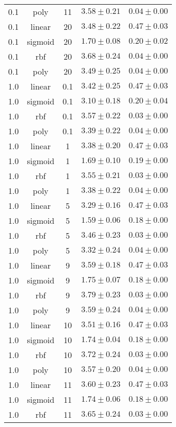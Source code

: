 \begin{tabular}{cccrr}
0.1 & poly & 11 & $3.58 \pm 0.21$ & $0.04 \pm 0.00$\\
0.1 & linear & 20 & $3.48 \pm 0.22$ & $0.47 \pm 0.03$\\
0.1 & sigmoid & 20 & $1.70 \pm 0.08$ & $0.20 \pm 0.02$\\
0.1 & rbf & 20 & $3.68 \pm 0.24$ & $0.04 \pm 0.00$\\
0.1 & poly & 20 & $3.49 \pm 0.25$ & $0.04 \pm 0.00$\\
1.0 & linear & 0.1 & $3.42 \pm 0.25$ & $0.47 \pm 0.03$\\
1.0 & sigmoid & 0.1 & $3.10 \pm 0.18$ & $0.20 \pm 0.04$\\
1.0 & rbf & 0.1 & $3.57 \pm 0.22$ & $0.03 \pm 0.00$\\
1.0 & poly & 0.1 & $3.39 \pm 0.22$ & $0.04 \pm 0.00$\\
1.0 & linear & 1 & $3.38 \pm 0.20$ & $0.47 \pm 0.03$\\
1.0 & sigmoid & 1 & $1.69 \pm 0.10$ & $0.19 \pm 0.00$\\
1.0 & rbf & 1 & $3.55 \pm 0.21$ & $0.03 \pm 0.00$\\
1.0 & poly & 1 & $3.38 \pm 0.22$ & $0.04 \pm 0.00$\\
1.0 & linear & 5 & $3.29 \pm 0.16$ & $0.47 \pm 0.03$\\
1.0 & sigmoid & 5 & $1.59 \pm 0.06$ & $0.18 \pm 0.00$\\
1.0 & rbf & 5 & $3.46 \pm 0.23$ & $0.03 \pm 0.00$\\
1.0 & poly & 5 & $3.32 \pm 0.24$ & $0.04 \pm 0.00$\\
1.0 & linear & 9 & $3.59 \pm 0.18$ & $0.47 \pm 0.03$\\
1.0 & sigmoid & 9 & $1.75 \pm 0.07$ & $0.18 \pm 0.00$\\
1.0 & rbf & 9 & $3.79 \pm 0.23$ & $0.03 \pm 0.00$\\
1.0 & poly & 9 & $3.59 \pm 0.24$ & $0.04 \pm 0.00$\\
1.0 & linear & 10 & $3.51 \pm 0.16$ & $0.47 \pm 0.03$\\
1.0 & sigmoid & 10 & $1.74 \pm 0.04$ & $0.18 \pm 0.00$\\
1.0 & rbf & 10 & $3.72 \pm 0.24$ & $0.03 \pm 0.00$\\
1.0 & poly & 10 & $3.57 \pm 0.20$ & $0.04 \pm 0.00$\\
1.0 & linear & 11 & $3.60 \pm 0.23$ & $0.47 \pm 0.03$\\
1.0 & sigmoid & 11 & $1.74 \pm 0.06$ & $0.18 \pm 0.00$\\
1.0 & rbf & 11 & $3.65 \pm 0.24$ & $0.03 \pm 0.00$\\

\end{tabular}
